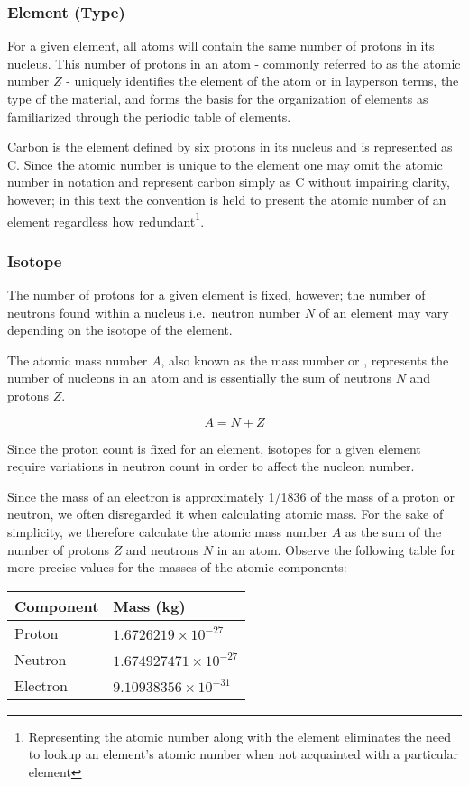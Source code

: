\subsubsection{Element (Type)} For a given element, all atoms will contain the same
number of protons in its nucleus.  This number of protons in an atom - commonly
referred to as the atomic number  $Z$ - uniquely identifies
the element of the atom or in layperson terms, the type of the material, and
forms the basis for the organization of elements as familiarized through the
periodic table of elements.

Carbon is the element defined by six protons in its nucleus and is represented
as C. Since the atomic number is unique to the element one may omit the
atomic number in notation and represent carbon simply as \ce{}C without
impairing clarity, however; in this text the convention is held to present the
atomic number of an element regardless how redundant\footnote{Representing the
atomic number along with the element eliminates the need to lookup an element's
atomic number when not acquainted with a particular element}.

\subsubsection{Isotope} The number of protons for a given element is fixed,
however; the number of neutrons found within a nucleus i.e.\ neutron number $N$
of an element may vary depending on the isotope of the element.

The atomic mass number $A$, also known as the mass
number or , represents the number of nucleons in an atom
and is essentially the sum of neutrons $N$ and protons $Z$.

$$A = N + Z$$

Since the proton count is fixed for an element, isotopes for a given element
require variations in neutron count in order to affect the nucleon number.

\begin{tcolorbox}[colback=blue!5!white,colframe=blue!75!black]
Since the mass of an electron is approximately 1/1836 of the mass of a proton or
neutron, we often disregarded it when calculating atomic mass. For the sake of
simplicity, we therefore calculate the atomic mass number $A$ as the sum of the
number of protons $Z$ and neutrons $N$ in an atom. Observe the following table
for more precise values for the masses of the atomic components:
\begin{tabularx}{\linewidth}{|X|X|}
\hline Component & Mass (kg) \\ \hline
Proton & $1.6726219 \times 10^{-27}$ \\
Neutron & $1.674927471 \times 10^{-27}$ \\
Electron & $9.10938356 \times 10^{-31}$ \\
\hline
\end{tabularx}
\end{tcolorbox}

